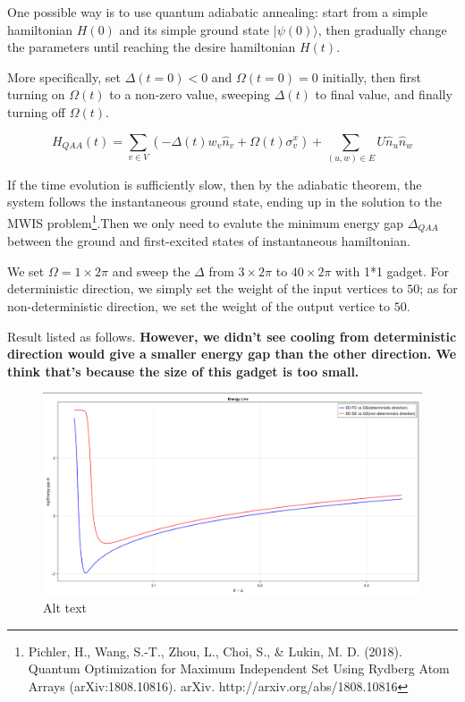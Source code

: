 \documentclass[twocolumn,superscriptaddress,english,showpacs,longbibliography]{revtex4-2}
\begin{document}
One possible way is to use quantum adiabatic annealing: start from a
simple hamiltonian $H(0)$ and its simple ground state
$|\psi(0)\rangle$, then gradually change the parameters until reaching
the desire hamiltonian $H(t)$.

More specifically, set $\Delta(t=0) <0$ and $\Omega(t=0) =0$
initially, then first turning on $\Omega(t)$ to a non-zero value,
sweeping $\Delta(t)$ to final value, and finally turning off
$\Omega(t)$.

\[
H_{QAA}(t) = \sum_{v\in V} (-\Delta(t)w_v \hat n_v + \Omega(t)\sigma_{v}^x) + \sum_{(u,w) \in E} U\hat n_u \hat n_w
\]

If the time evolution is sufficiently slow, then by the adiabatic
theorem, the system follows the instantaneous ground state, ending up in
the solution to the MWIS problem\footnote{Pichler, H., Wang, S.-T.,
  Zhou, L., Choi, S., \& Lukin, M. D. (2018). Quantum Optimization for
  Maximum Independent Set Using Rydberg Atom Arrays (arXiv:1808.10816).
  arXiv. http://arxiv.org/abs/1808.10816}.Then we only need to evalute
the minimum energy gap $\Delta_{QAA}$ between the ground and
first-excited states of instantaneous hamiltonian.

We set $\Omega = 1 \times 2\pi$ and sweep the $\Delta$ from $3
\times 2\pi$ to $40 \times 2\pi$ with 1*1 gadget. For deterministic
direction, we simply set the weight of the input vertices to $50$; as
for non-deterministic direction, we set the weight of the output vertice
to $50$.

Result listed as follows. \textbf{However, we didn't see cooling from
deterministic direction would give a smaller energy gap than the other
direction. We think that's because the size of this gadget is too
small.}

\begin{figure}
\centering
\includegraphics[width=5.20833in,height=\textheight,keepaspectratio]{../notes/images/energy_gap_1_gadget.png}
\caption{Alt text}
\end{figure}
\end{document}
